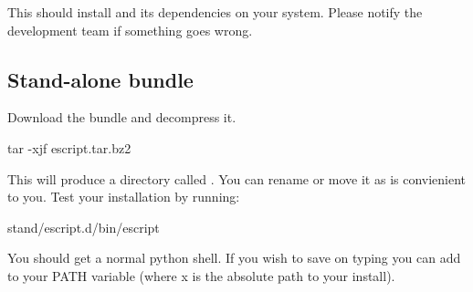 This should install \esfinley and its dependencies on your system.
Please notify the development team if something goes wrong.


\subsection{Stand-alone bundle}\label{sec:standalonelinux}

Download the bundle and decompress it.
\begin{shellCode}
tar -xjf escript.tar.bz2 
\end{shellCode}
This will produce a directory called . 
You can rename or move it as is convienient to you.
Test your installation by running:
\begin{shellCode}
 stand/escript.d/bin/escript
\end{shellCode}
You should get a normal python shell.
If you wish to save on typing you can add  to your PATH variable (where x is the absolute path to your install).

